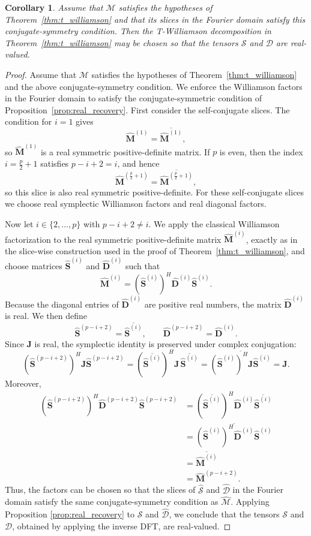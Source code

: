 \documentclass[pdflatex,sn-mathphys-ay]{sn-jnl}
\newcommand{\T}[1]{\mathcal{#1}}    %
\newcommand{\M}[1]{\bm{#1}}     %
\theoremstyle{thmstyleone}
\newtheorem{corollary}[theorem]{Corollary}
\theoremstyle{thmstyletwo}
\theoremstyle{thmstylethree}
\numberwithin{equation}{section}
\begin{document}
\begin{corollary}
    Assume that $\T{M}$ satisfies the hypotheses of Theorem~\ref{thm:t_williamson} and that its slices in the Fourier domain satisfy this conjugate-symmetry condition. Then the T-Williamson decomposition in Theorem~\ref{thm:t_williamson} may be chosen so that the tensors $\T{S}$ and $\T{D}$ are real-valued.
\end{corollary}
\begin{proof}
Assume that $\T{M}$ satisfies the hypotheses of Theorem~\ref{thm:t_williamson} and the above conjugate-symmetry condition. 
We enforce the Williamson factors in the Fourier domain to satisfy the conjugate-symmetric condition of Proposition~\ref{prop:real_recovery}.
First consider the self-conjugate slices. The condition for $i=1$ gives
$$
\widehat{\M{M}}^{(1)} = \overline{\widehat{\M{M}}^{(1)}},
$$
so $\widehat{\M{M}}^{(1)}$ is a real symmetric positive-definite matrix. If $p$ is even, then the index $i=\frac{p}{2}+1$ satisfies $p-i+2=i$, and hence
$$
\widehat{\M{M}}^{(\frac{p}{2}+1)} = \overline{\widehat{\M{M}}^{(\frac{p}{2}+1)}},
$$
so this slice is also real symmetric positive-definite. For these self-conjugate slices we choose real symplectic Williamson factors and real diagonal factors.

Now let $i \in \{2,\dots,p\}$ with $p-i+2 \neq i$. We apply the classical Williamson factorization to the real symmetric positive-definite matrix $\widehat{\M{M}}^{(i)}$, exactly as in the slice-wise construction used in the proof of Theorem~\ref{thm:t_williamson}, and choose matrices $\widehat{\M{S}}^{(i)}$ and $\widehat{\M{D}}^{(i)}$ such that
$$
\widehat{\M{M}}^{(i)} = (\widehat{\M{S}}^{(i)})^H \widehat{\M{D}}^{(i)} \widehat{\M{S}}^{(i)}.
$$
Because the diagonal entries of $\widehat{\M{D}}^{(i)}$ are positive real numbers, the matrix $\widehat{\M{D}}^{(i)}$ is real. We then define
$$
\widehat{\M{S}}^{(p-i+2)} = \overline{\widehat{\M{S}}^{(i)}},
\qquad
\widehat{\M{D}}^{(p-i+2)} = \widehat{\M{D}}^{(i)}.
$$
Since $\M{J}$ is real, the symplectic identity is preserved under complex conjugation:
$$
(\widehat{\M{S}}^{(p-i+2)})^H \M{J}\widehat{\M{S}}^{(p-i+2)}
=
(\overline{\widehat{\M{S}}^{(i)}})^H \M{J}\,\overline{\widehat{\M{S}}^{(i)}}
=
\overline{(\widehat{\M{S}}^{(i)})^H \M{J}\widehat{\M{S}}^{(i)}}
=
\M{J}.
$$
Moreover,
\begin{align*}
(\widehat{\M{S}}^{(p-i+2)})^H \widehat{\M{D}}^{(p-i+2)} \widehat{\M{S}}^{(p-i+2)}
&=
(\overline{\widehat{\M{S}}^{(i)}})^H \widehat{\M{D}}^{(i)} \overline{\widehat{\M{S}}^{(i)}} \\
&=
\overline{(\widehat{\M{S}}^{(i)})^H \widehat{\M{D}}^{(i)} \widehat{\M{S}}^{(i)}} \\
&=
\overline{\widehat{\M{M}}^{(i)}} \\
&=
\widehat{\M{M}}^{(p-i+2)}.
\end{align*}
Thus, the factors can be chosen so that the  slices of $\widehat{\T{S}}$ and $\widehat{\T{D}}$ in the Fourier domain satisfy the same conjugate-symmetry condition as $\widehat{\T{M}}$. Applying Proposition \ref{prop:real_recovery} to $\widehat{\T{S}}$ and $\widehat{\T{D}}$, we conclude that the tensors $\T{S}$ and $\T{D}$, obtained by applying the inverse DFT, are real-valued.
\end{proof}
\end{document}
